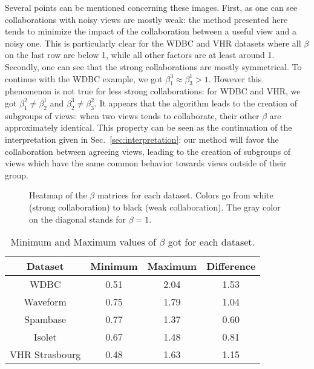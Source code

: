Several points can be mentioned concerning these images. First, as one can see collaborations with noisy views are mostly weak:  the method presented here tends to minimize the impact of the collaboration between a useful view and a noisy one. This is particularly clear for the WDBC and VHR datasets where all $\beta$ on the last row are below 1, while all other factors are at least around 1. Secondly, one can see that the strong collaborations are mostly symmetrical. To continue with the WDBC example, we got $\beta_1^3 \approx \beta_3^1 > 1$. However this phenomenon is not true for less strong collaborations: for WDBC and VHR, we got $\beta_1^2 \neq \beta_2^1$ and $\beta_2^3 \neq \beta_3^2$. It appears that the algorithm leads to the creation of subgroups of views: when two views tends to collaborate, their other $\beta$ are approximately identical. This property can be seen as the continuation of the interpretation given in Sec.~\ref{sec:interpretation}: our method will favor the collaboration between agreeing views, leading to the creation of subgroups of views which have the same common behavior towards views outside of their group.

\begin{figure}[!h]
	\centering

    \centering
	\caption{Heatmap of the $\beta$ matrices for each dataset. Colors go from white (strong collaboration) to black (weak collaboration). The gray color on the diagonal stands for $\beta=1$.}
\label{fig:betas}
\end{figure}

\begin{table}[htbp]
	\caption{Minimum and Maximum values of $\beta$ got for each dataset.}
\label{tab:minmax}
	\begin{center}
		\begin{tabular}{cccc}
			\toprule
			Dataset & Minimum & Maximum & Difference
			\\
			\midrule
			WDBC & 0.51 & 2.04 & 1.53\\
			Waveform & 0.75 & 1.79 & 1.04\\
			Spambase & 0.77 & 1.37 & 0.60\\
			Isolet & 0.67 & 1.48 & 0.81\\
			VHR Strasbourg & 0.48 & 1.63 & 1.15\\
			\bottomrule
		\end{tabular}
	\end{center}
\end{table}

